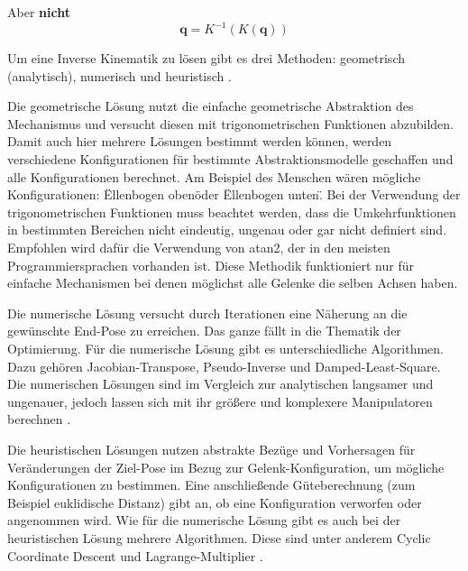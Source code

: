 Aber \textbf{nicht}
\begin{displaymath}
\textbf{q} = K^{-1}(K(\textbf{q}))
\end{displaymath}

Um eine Inverse Kinematik zu lösen gibt es drei Methoden: geometrisch (analytisch), numerisch und heuristisch \citep{danielasteidl2011}.

Die geometrische Lösung nutzt die einfache geometrische Abstraktion des Mechanismus und versucht diesen mit trigonometrischen Funktionen abzubilden. Damit auch hier mehrere Lösungen bestimmt werden können, werden verschiedene Konfigurationen für bestimmte Abstraktionsmodelle geschaffen und alle Konfigurationen berechnet. Am Beispiel des Menschen wären mögliche Konfigurationen: \"Ellenbogen oben\" oder \"Ellenbogen unten\". Bei der Verwendung der trigonometrischen Funktionen muss beachtet werden, dass die Umkehrfunktionen in bestimmten Bereichen nicht eindeutig, ungenau oder gar nicht definiert sind. Empfohlen wird dafür die Verwendung von atan2, der in den meisten Programmiersprachen vorhanden ist. Diese Methodik funktioniert nur für einfache Mechanismen bei denen möglichst alle Gelenke die selben Achsen haben.

Die numerische Lösung versucht durch Iterationen eine Näherung an die gewünschte End-Pose zu erreichen. Das ganze fällt in die Thematik der Optimierung. Für die numerische Lösung gibt es unterschiedliche Algorithmen. Dazu gehören Jacobian-Transpose, Pseudo-Inverse und Damped-Least-Square. Die numerischen Lösungen sind im Vergleich zur analytischen langsamer und ungenauer, jedoch lassen sich mit ihr größere und komplexere Manipulatoren berechnen \citep{danielasteidl2011}.

Die heuristischen Lösungen nutzen abstrakte Bezüge und Vorhersagen für Veränderungen der Ziel-Pose im Bezug zur Gelenk-Konfiguration, um mögliche Konfigurationen zu bestimmen. Eine anschließende Güteberechnung (zum Beispiel euklidische Distanz) gibt an, ob eine Konfiguration verworfen oder angenommen wird. Wie für die numerische Lösung gibt es auch bei der heuristischen Lösung mehrere Algorithmen. Diese sind unter anderem Cyclic Coordinate Descent und Lagrange-Multiplier \citep{danielasteidl2011}.

